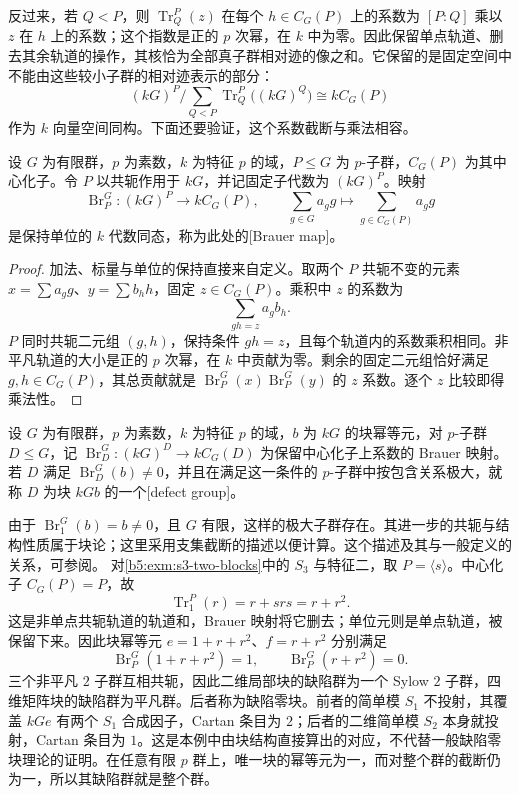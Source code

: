 \ProseParagraphBreak

反过来，若 \(Q<P\)，则 \(\operatorname{Tr}_Q^P(z)\) 在每个 \(h\in C_G(P)\) 上的系数为 \([P:Q]\) 乘以 \(z\) 在 \(h\) 上的系数；这个指数是正的 \(p\) 次幂，在 \(k\) 中为零。因此保留单点轨道、删去其余轨道的操作，其核恰为全部真子群相对迹的像之和。它保留的是固定空间中不能由这些较小子群的相对迹表示的部分：
\[
	(kG)^P\big/\sum_{Q<P} \operatorname{Tr}_Q^P\bigl((kG)^Q\bigr) \cong kC_G(P)
\]
作为 \(k\) 向量空间同构。下面还要验证，这个系数截断与乘法相容。

\begin{proposition}\label{b5:prop:brauer-truncation}
	设 \(G\) 为有限群，\(p\) 为素数，\(k\) 为特征 \(p\) 的域，\(P\le G\) 为 \(p\)-子群，\(C_G(P)\) 为其中心化子。令 \(P\) 以共轭作用于 \(kG\)，并记固定子代数为 \((kG)^P\)。映射
	\[
		\operatorname{Br}_P^G:(kG)^P\longrightarrow kC_G(P),\qquad \sum_{g\in G}a_gg\longmapsto\sum_{g\in C_G(P)}a_gg
	\]
	是保持单位的 \(k\) 代数同态，称为此处的[Brauer map]。
\end{proposition}
\begin{proof}
	加法、标量与单位的保持直接来自定义。取两个 \(P\) 共轭不变的元素 \(x=\sum a_gg\)、\(y=\sum b_hh\)，固定 \(z\in C_G(P)\)。乘积中 \(z\) 的系数为
	\[
		\sum_{gh=z}a_gb_h.
	\]
	\(P\) 同时共轭二元组 \((g,h)\)，保持条件 \(gh=z\)，且每个轨道内的系数乘积相同。非平凡轨道的大小是正的 \(p\) 次幂，在 \(k\) 中贡献为零。剩余的固定二元组恰好满足 \(g,h\in C_G(P)\)，其总贡献就是 \(\operatorname{Br}_P^G(x)\operatorname{Br}_P^G(y)\) 的 \(z\) 系数。逐个 \(z\) 比较即得乘法性。
\end{proof}
\begin{definition}\label{b5:def:block-defect-group}
	设 \(G\) 为有限群，\(p\) 为素数，\(k\) 为特征 \(p\) 的域，\(b\) 为 \(kG\) 的块幂等元，对 \(p\)-子群 \(D\le G\)，记 \(\operatorname{Br}_D^G:(kG)^D\to kC_G(D)\) 为保留中心化子上系数的 Brauer 映射。若 \(D\) 满足 \(\operatorname{Br}_D^G(b)\ne0\)，并且在满足这一条件的 \(p\)-子群中按包含关系极大，就称 \(D\) 为块 \(kGb\) 的一个[defect group]。
\end{definition}
由于 \(\operatorname{Br}_{1}^G(b)=b\ne0\)，且 \(G\) 有限，这样的极大子群存在。其进一步的共轭与结构性质属于块论；这里采用支集截断的描述以便计算。这个描述及其与一般定义的关系，可参阅\cite[Corollaries 12.5.4--12.5.5]{Webb2016FiniteGroupRepresentations}。
\ProseParagraphBreak
对\cref{b5:exm:s3-two-blocks}中的 \(S_3\) 与特征二，取 \(P=\langle s\rangle\)。中心化子 \(C_G(P)=P\)，故
\[
	\operatorname{Tr}_{1}^{P}(r)=r+srs=r+r^2.
\]
这是非单点共轭轨道的轨道和，Brauer 映射将它删去；单位元则是单点轨道，被保留下来。因此块幂等元 \(e=1+r+r^2\)、\(f=r+r^2\) 分别满足
\[
	\operatorname{Br}_P^G(1+r+r^2)=1,\qquad \operatorname{Br}_P^G(r+r^2)=0.
\]
三个非平凡 \(2\) 子群互相共轭，因此二维局部块的缺陷群为一个 Sylow \(2\) 子群，四维矩阵块的缺陷群为平凡群。后者称为缺陷零块。前者的简单模 \(S_1\) 不投射，其覆盖 \(kGe\) 有两个 \(S_1\) 合成因子，Cartan 条目为 \(2\)；后者的二维简单模 \(S_2\) 本身就投射，Cartan 条目为 \(1\)。这是本例中由块结构直接算出的对应，不代替一般缺陷零块理论的证明。在任意有限 \(p\) 群上，唯一块的幂等元为一，而对整个群的截断仍为一，所以其缺陷群就是整个群。

